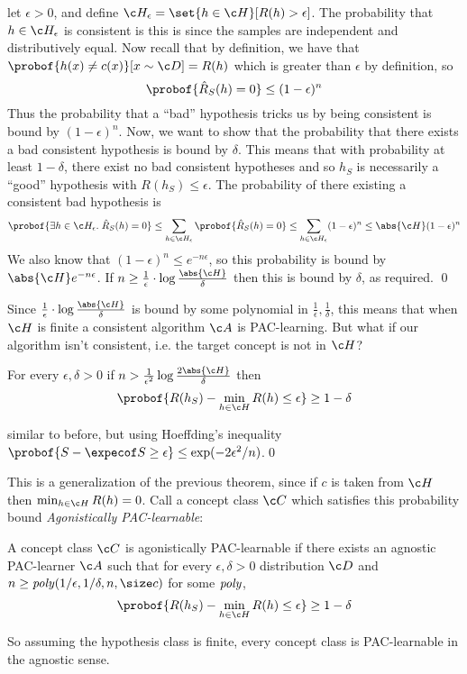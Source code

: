 \ethrm

\Proof let $\epsilon>0$, and define $\c H_\epsilon=\set{h\in\c H}[R(h)>\epsilon]$.
The probability that $h\in\c H_\epsilon$ is consistent is
this is since the samples are independent and distributively equal.
Now recall that by definition, we have that $\probof{h(x)\neq c(x)}[x\sim\c D]=R(h)$ which is greater than $\epsilon$ by definition, so
$$ \probof{\hat R_S(h)=0} \leq (1-\epsilon)^n $$
Thus the probability that a ``bad'' hypothesis tricks us by being consistent is bound by $(1-\epsilon)^n$.
Now, we want to show that the probability that there exists a bad consistent hypothesis is bound by $\delta$.
This means that with probability at least $1-\delta$, there exist no bad consistent hypotheses and so $h_S$ is necessarily a ``good'' hypothesis with $R(h_S)\leq\epsilon$.
The probability of there existing a consistent bad hypothesis is
$$ \probof{\exists h\in\c H_\epsilon.\;\hat R_S(h)=0} \leq \sum_{h\in\c H_\epsilon}\probof{\hat R_S(h)=0} \leq \sum_{h\in\c H_\epsilon}(1-\epsilon)^n \leq \abs{\c H}(1-\epsilon)^n $$
We also know that $(1-\epsilon)^n\leq e^{-n\epsilon}$, so this probability is bound by $\abs{\c H}e^{-n\epsilon}$.
If $n\geq\frac1\epsilon\cdot\log\frac{\abs{\c H}}\delta$ then this is bound by $\delta$, as required.
\qed

Since $\frac1\epsilon\cdot\log\frac{\abs{\c H}}\delta$ is bound by some polynomial in $\frac1\epsilon,\frac1\delta$, this means that when $\c H$ is finite a consistent algorithm $\c A$ is PAC-learning.
But what if our algorithm isn't consistent, i.e. the target concept is not in $\c H$?

\bthrm

    For every $\epsilon,\delta>0$ if $n>\frac1{\epsilon^2}\log\frac{2\abs{\c H}}\delta$ then
    $$ \probof{R(h_S) - \min_{h\in\c H}R(h)\leq\epsilon} \geq 1 - \delta $$

\ethrm

\Proof similar to before, but using Hoeffding's inequality $\probof{S-\expecof S\geq\epsilon}\leq\exp(-2\epsilon^2/n)$.\qed

This is a generalization of the previous theorem, since if $c$ is taken from $\c H$ then $\min_{h\in\c H}R(h)=0$.
Call a concept class $\c C$ which satisfies this probability bound {\it Agonistically PAC-learnable}:

\bdefn

    A concept class $\c C$ is {\emphcolor agonistically PAC-learnable} if there exists an {\emphcolor agnostic PAC-learner} $\c A$ such that for every $\epsilon,\delta>0$ distribution $\c D$ and 
    $n\geq{\it poly}(1/\epsilon,1/\delta,n,\size c)$ for some ${\it poly}$,
    $$ \probof{R(h_S) - \min_{h\in\c H}R(h)\leq\epsilon} \geq 1 - \delta $$

\edefn

So assuming the hypothesis class is finite, every concept class is PAC-learnable in the agnostic sense.

